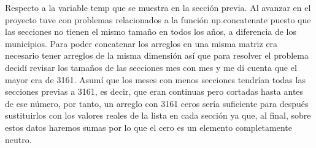 \documentclass[12pt,letterpaper]{article}
\begin{document}
\normalsize{Respecto a la variable temp que se muestra en la sección previa. Al avanzar en el proyecto tuve con problemas relacionados a la función np.concatenate puesto que las secciones no tienen el mismo tamaño en todos los años, a diferencia de los municipios. Para poder concatenar los arreglos en una misma matriz era necesario tener arreglos de la misma dimensión así que para resolver el problema decidí revisar los tamaños de las secciones mes con mes y me di cuenta que el mayor era de 3161. Asumí que los meses con menos secciones tendrían todas las secciones previas a 3161, es decir, que eran continuas pero cortadas hasta antes de ese número, por tanto, un arreglo con 3161 ceros sería suficiente para después sustituirlos con los valores reales de la lista en cada sección ya que, al final, sobre estos datos haremos sumas por lo que el cero es un elemento completamente neutro.}\\
\end{document}
